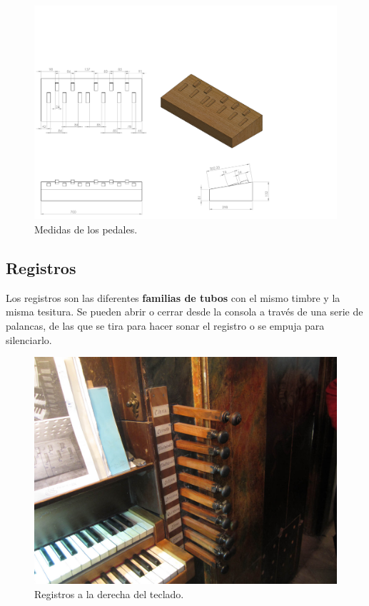 \begin{figure}[H]
	\noindent \begin{centering}
		\includegraphics[clip=true,trim=0 0 260 250, width=\linewidth*3/4]{capitulo3/pedalier_modelo}
		\par\end{centering}
	\smallskip
	\caption{\label{fig:pedalier_modelo} Medidas de los pedales.}
\end{figure} 

\smallskip

\subsection{Registros}

Los registros son las diferentes \textbf{familias de tubos} con el mismo timbre y la misma tesitura. Se pueden abrir o cerrar desde la consola a través de una serie de palancas, de las que se tira para hacer sonar el registro o se empuja para silenciarlo.

\smallskip

\begin{figure}[H]
	\noindent \begin{centering}
		\includegraphics[width=\linewidth*2/3]{capitulo3/registros}
		\par\end{centering}
	\smallskip
	\caption{\label{fig:registros} Registros a la derecha del teclado.}
\end{figure} 

